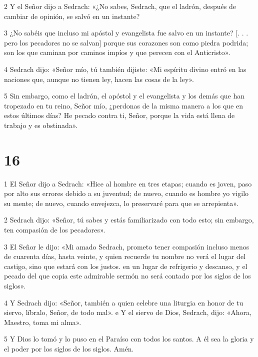 \par 2 Y el Señor dijo a Sedrach: «¿No sabes, Sedrach, que el ladrón, después de cambiar de opinión, se salvó en un instante?

\par 3 ¿No sabéis que incluso mi apóstol y evangelista fue salvo en un instante? [. . . pero los pecadores no se salvan] porque sus corazones son como piedra podrida; son los que caminan por caminos impíos y que perecen con el Anticristo».

\par 4 Sedrach dijo: «Señor mío, tú también dijiste: «Mi espíritu divino entró en las naciones que, aunque no tienen ley, hacen las cosas de la ley».

\par 5 Sin embargo, como el ladrón, el apóstol y el evangelista y los demás que han tropezado en tu reino, Señor mío, ¿perdonas de la misma manera a los que en estos últimos días? He pecado contra ti, Señor, porque la vida está llena de trabajo y es obstinada».

\chapter{16}

\par 1 El Señor dijo a Sedrach: «Hice al hombre en tres etapas; cuando es joven, paso por alto sus errores debido a su juventud; de nuevo, cuando es hombre yo vigilo su mente; de nuevo, cuando envejezca, lo preservaré para que se arrepienta».

\par 2 Sedrach dijo: «Señor, tú sabes y estás familiarizado con todo esto; sin embargo, ten compasión de los pecadores».

\par 3 El Señor le dijo: «Mi amado Sedrach, prometo tener compasión incluso menos de cuarenta días, hasta veinte, y quien recuerde tu nombre no verá el lugar del castigo, sino que estará con los justos. en un lugar de refrigerio y descanso, y el pecado del que copia este admirable sermón no será contado por los siglos de los siglos».

\par 4 Y Sedrach dijo: «Señor, también a quien celebre una liturgia en honor de tu siervo, líbralo, Señor, de todo mal». e Y el siervo de Dios, Sedrach, dijo: «Ahora, Maestro, toma mi alma».

\par 5 Y Dios lo tomó y lo puso en el Paraíso con todos los santos. A él sea la gloria y el poder por los siglos de los siglos. Amén.




